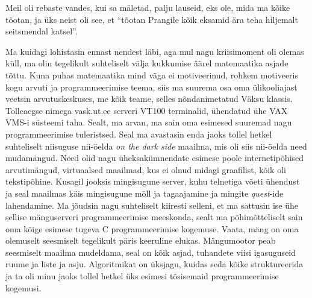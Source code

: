 Meil oli rebaste vandes, kui sa mäletad, palju lauseid, eks ole, mida ma kõike tõotan, ja üks neist oli see, et \enquote{tõotan Prangile kõik eksamid ära teha hiljemalt seitsmendal katsel}. 


Ma kuidagi lohistasin ennast nendest läbi, aga mul nagu kriisimoment oli olemas küll, ma olin tegelikult suhteliselt välja kukkumise äärel  matemaatika asjade tõttu. Kuna puhas matemaatika mind väga ei motiveerinud, rohkem motiveeris kogu arvuti ja programmeerimise teema, siis ma suurema osa oma ülikooliajast veetsin arvutuskeskuses, me kõik teame, selles nõndanimetatud Väksu klassis. Tolleaegse nimega vask.ut.ee serveri VT100 terminalid, ühendatud ühe VAX VMS-i  süsteemi taha. Sealt, ma arvan, ma sain oma esimesed suuremad  nagu programmeerimise tuleristsed.  Seal ma avastasin enda jaoks tollel hetkel suhteliselt niisuguse nii-öelda \emph{on the dark side} maailma, mis oli siis nii-öelda need mudamängud. Need olid nagu üheksakümnendate esimese poole internetipõhised arvutimängud, virtuaalsed maailmad, kus ei olnud midagi graafilist, kõik oli tekstipõhine. Kusagil jooksis mingisugune server, kuhu telnetiga võeti ühendust ja seal maailmas käis mingisugune möll ja tagaajamine ja mingite \emph{quest}-ide lahendamine. Ma jõudsin nagu suhteliselt kiiresti selleni, et ma sattusin ise ühe sellise mänguserveri programmeerimise meeskonda, sealt ma põhimõtteliselt sain oma kõige esimese tugeva C programmeerimise kogemuse. Vaata, mäng on oma olemuselt seesmiselt tegelikult päris keeruline elukas. Mängumootor peab seesmiselt maailma mudeldama, seal on kõik asjad, tuhandete viisi igasuguseid ruume ja liste ja asju. Algoritmikat on üksjagu, kuidas seda kõike struktureerida ja ta oli minu jaoks tollel hetkel üks esimesi tõsisemaid  programmeerimise kogemusi. 


